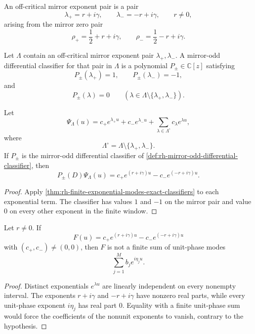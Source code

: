 \begin{definition}
\label{def:rh-off-critical-mirror-exponent-pair}
An off-critical mirror exponent pair is a pair
$$
\lambda_+=r+i\gamma,
\qquad
\lambda_-=-r+i\gamma,
\qquad
r\ne0,
$$
arising from the mirror zero pair
$$
\rho_+=\frac12+r+i\gamma,
\qquad
\rho_-=\frac12-r+i\gamma.
$$
\end{definition}

\begin{definition}
\label{def:rh-mirror-odd-differential-classifier}
Let $\Lambda$ contain an off-critical mirror exponent pair
$\lambda_+,\lambda_-$.  A mirror-odd differential classifier for that
pair in $\Lambda$ is a polynomial $P_\pm\in\mathbb C[z]$ satisfying
$$
P_\pm(\lambda_+)=1,
\qquad
P_\pm(\lambda_-)=-1,
$$
and
$$
P_\pm(\lambda)=0
\qquad
(\lambda\in\Lambda\setminus\{\lambda_+,\lambda_-\}).
$$
\end{definition}

\begin{theorem}
\label{thm:rh-mirror-odd-classifier-extracts-radial-pair}
Let
$$
\Psi_\Lambda(u)
=
c_+e^{\lambda_+u}
+
c_-e^{\lambda_-u}
+
\sum_{\lambda\in\Lambda^\circ}c_\lambda e^{\lambda u},
$$
where
$$
\Lambda^\circ=\Lambda\setminus\{\lambda_+,\lambda_-\}.
$$
If $P_\pm$ is the mirror-odd differential classifier of
\autoref{def:rh-mirror-odd-differential-classifier}, then
$$
P_\pm(D)\Psi_\Lambda(u)
=
c_+e^{(r+i\gamma)u}
-
c_-e^{(-r+i\gamma)u}.
$$
\end{theorem}

\begin{proof}
Apply \autoref{thm:rh-finite-exponential-modes-exact-classifiers} to
each exponential term.  The classifier has values $1$ and $-1$ on the
mirror pair and value $0$ on every other exponent in the finite window.
\end{proof}

\begin{lemma}
\label{lem:rh-radial-mirror-pair-not-unit-phase-packet}
Let $r\ne0$.  If
$$
F(u)
=
c_+e^{(r+i\gamma)u}
-
c_-e^{(-r+i\gamma)u}
$$
with $(c_+,c_-)\ne(0,0)$, then $F$ is not a finite sum of unit-phase
modes
$$
\sum_{j=1}^{M}b_j e^{i\eta_j u}.
$$
\end{lemma}

\begin{proof}
Distinct exponentials $e^{\lambda u}$ are linearly independent on every
nonempty interval.  The exponents $r+i\gamma$ and $-r+i\gamma$ have
nonzero real parts, while every unit-phase exponent $i\eta_j$ has real
part $0$.  Equality with a finite unit-phase sum would force the
coefficients of the nonunit exponents to vanish, contrary to the
hypothesis.
\end{proof}

